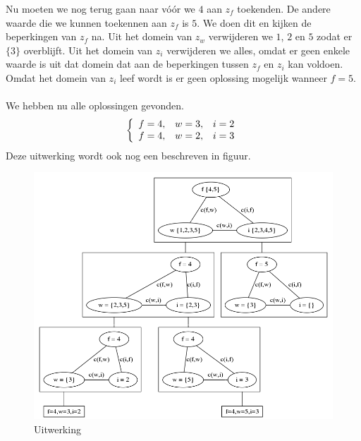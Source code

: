 \documentclass[alternative-exam.tex]{subfiles}
\begin{document}
Nu moeten we nog terug gaan naar v\'o\'or we $4$ aan $z_f$ toekenden. De andere waarde die we kunnen toekennen aan $z_f$ is $5$. We doen dit en kijken de beperkingen van $z_f$ na. Uit het domein van $z_w$ verwijderen we $1$, $2$ en $5$ zodat er $\{3\}$ overblijft. Uit het domein van $z_i$ verwijderen we alles, omdat er geen enkele waarde is uit dat domein dat aan de beperkingen tussen $z_f$ en $z_i$ kan voldoen. Omdat het domein van $z_i$ leef wordt is er geen oplossing mogelijk wanneer $f=5$.\\\\
We hebben nu alle oplossingen gevonden.
\[
\left\lbrace
\begin{array}{c c c}
f=4,& w=3,& i=2\\
f=4,& w=2,& i=3\\
\end{array}
\right.
\] 
Deze uitwerking wordt ook nog een beschreven in figuur.
\begin{figure}
[p]
\centering
\caption{Uitwerking}
\label{uitwerking}
\includegraphics[scale=0.4]{resources/graphs/uitwerking.png}
\end{figure}
\end{document}
